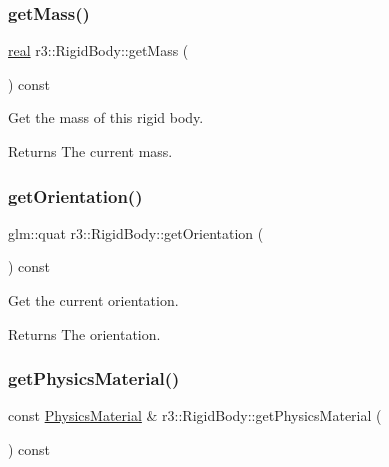 \subsubsection{\texorpdfstring{get\+Mass()}{getMass()}}
{\footnotesize\ttfamily \mbox{\hyperlink{namespacer3_ab2016b3e3f743fb735afce242f0dc1eb}{real}} r3\+::\+Rigid\+Body\+::get\+Mass (\begin{DoxyParamCaption}{ }\end{DoxyParamCaption}) const}



Get the mass of this rigid body. 

\begin{DoxyReturn}{Returns}
The current mass. 
\end{DoxyReturn}
\mbox{\label{classr3_1_1_rigid_body_ae12d1d4d9dbbb970ed83fa1eab2d928a}} 
\subsubsection{\texorpdfstring{get\+Orientation()}{getOrientation()}}
{\footnotesize\ttfamily glm\+::quat r3\+::\+Rigid\+Body\+::get\+Orientation (\begin{DoxyParamCaption}{ }\end{DoxyParamCaption}) const}



Get the current orientation. 

\begin{DoxyReturn}{Returns}
The orientation. 
\end{DoxyReturn}
\mbox{\label{classr3_1_1_rigid_body_ab73b4319a248ebf6557851afa5050481}} 
\subsubsection{\texorpdfstring{get\+Physics\+Material()}{getPhysicsMaterial()}}
{\footnotesize\ttfamily const \mbox{\hyperlink{classr3_1_1_physics_material}{Physics\+Material}} \& r3\+::\+Rigid\+Body\+::get\+Physics\+Material (\begin{DoxyParamCaption}{ }\end{DoxyParamCaption}) const}



